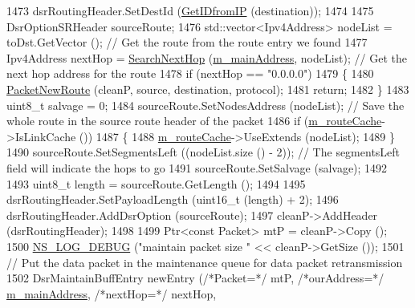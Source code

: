 \begin{DoxyCode}
1473           dsrRoutingHeader.SetDestId (\hyperlink{classns3_1_1dsr_1_1DsrRouting_a4593e50d5f36e9b9b013fe0422067c44}{GetIDfromIP} (destination));
1474 
1475           DsrOptionSRHeader sourceRoute;
1476           std::vector<Ipv4Address> nodeList = toDst.GetVector ();       \textcolor{comment}{// Get the route from the route
       entry we found}
1477           Ipv4Address nextHop = \hyperlink{classns3_1_1dsr_1_1DsrRouting_aa1b16658c14499af76ca7dd69c034f22}{SearchNextHop} (\hyperlink{classns3_1_1dsr_1_1DsrRouting_a73182b5edee2d8460f28855e058fc9a0}{m\_mainAddress}, nodeList);        \textcolor{comment}{
      // Get the next hop address for the route}
1478           \textcolor{keywordflow}{if} (nextHop == \textcolor{stringliteral}{"0.0.0.0"})
1479             \{
1480               \hyperlink{classns3_1_1dsr_1_1DsrRouting_ae70ab39db551d1d81afc081196f78017}{PacketNewRoute} (cleanP, source, destination, protocol);
1481               \textcolor{keywordflow}{return};
1482             \}
1483           uint8\_t salvage = 0;
1484           sourceRoute.SetNodesAddress (nodeList);       \textcolor{comment}{// Save the whole route in the source route header
       of the packet}
1486 \textcolor{comment}{}          \textcolor{keywordflow}{if} (\hyperlink{classns3_1_1dsr_1_1DsrRouting_ac409bdb961b9fff0fb63ebd026be99ad}{m\_routeCache}->IsLinkCache ())
1487             \{
1488               \hyperlink{classns3_1_1dsr_1_1DsrRouting_ac409bdb961b9fff0fb63ebd026be99ad}{m\_routeCache}->UseExtends (nodeList);
1489             \}
1490           sourceRoute.SetSegmentsLeft ((nodeList.size () - 2));       \textcolor{comment}{// The segmentsLeft field will
       indicate the hops to go}
1491           sourceRoute.SetSalvage (salvage);
1492 
1493           uint8\_t length = sourceRoute.GetLength ();
1494 
1495           dsrRoutingHeader.SetPayloadLength (uint16\_t (length) + 2);
1496           dsrRoutingHeader.AddDsrOption (sourceRoute);
1497           cleanP->AddHeader (dsrRoutingHeader);
1498 
1499           Ptr<const Packet> mtP = cleanP->Copy ();
1500           \hyperlink{group__logging_ga413f1886406d49f59a6a0a89b77b4d0a}{NS\_LOG\_DEBUG} (\textcolor{stringliteral}{"maintain packet size "} << cleanP->GetSize ());
1501           \textcolor{comment}{// Put the data packet in the maintenance queue for data packet retransmission}
1502           DsrMaintainBuffEntry newEntry (\textcolor{comment}{/*Packet=*/} mtP, \textcolor{comment}{/*ourAddress=*/} 
      \hyperlink{classns3_1_1dsr_1_1DsrRouting_a73182b5edee2d8460f28855e058fc9a0}{m\_mainAddress}, \textcolor{comment}{/*nextHop=*/} nextHop,

\end{DoxyCode}
